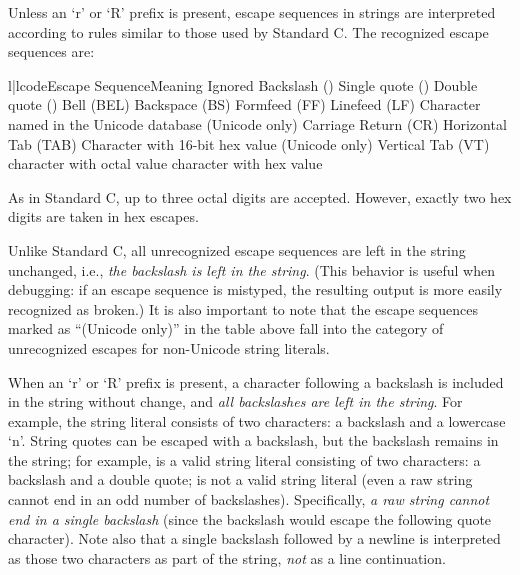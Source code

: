 Unless an `r' or `R' prefix is present, escape sequences in strings
are interpreted according to rules similar
to those used by Standard C.  The recognized escape sequences are:

\begin{tableii}{l|l}{code}{Escape Sequence}{Meaning}
 {Ignored}
\lineii{\e\e}	{Backslash (\code{\e})}
	{Single quote ()}
	{Double quote ()}
	{\ASCII{} Bell (BEL)}
	{\ASCII{} Backspace (BS)}
	{\ASCII{} Formfeed (FF)}
	{\ASCII{} Linefeed (LF)}
       {Character named  in the Unicode database (Unicode only)}
	{\ASCII{} Carriage Return (CR)}
	{\ASCII{} Horizontal Tab (TAB)}
    {Character with 16-bit hex value  (Unicode only)}
	{\ASCII{} Vertical Tab (VT)}
 {\ASCII{} character with octal value }
 {\ASCII{} character with hex value }
\end{tableii}

As in Standard C, up to three octal digits are accepted.  However,
exactly two hex digits are taken in hex escapes.

Unlike Standard C,
all unrecognized escape sequences are left in the string unchanged,
i.e., \emph{the backslash is left in the string}.  (This behavior is
useful when debugging: if an escape sequence is mistyped, the
resulting output is more easily recognized as broken.)  It is also
important to note that the escape sequences marked as ``(Unicode
only)'' in the table above fall into the category of unrecognized
escapes for non-Unicode string literals.

When an `r' or `R' prefix is present, a character following a
backslash is included in the string without change, and \emph{all
backslashes are left in the string}.  For example, the string literal
 consists of two characters: a backslash and a lowercase
`n'.  String quotes can be escaped with a backslash, but the backslash
remains in the string; for example,  is a valid string
literal consisting of two characters: a backslash and a double quote;
 is not a valid string literal (even a raw string cannot
end in an odd number of backslashes).  Specifically, \emph{a raw
string cannot end in a single backslash} (since the backslash would
escape the following quote character).  Note also that a single
backslash followed by a newline is interpreted as those two characters
as part of the string, \emph{not} as a line continuation.


